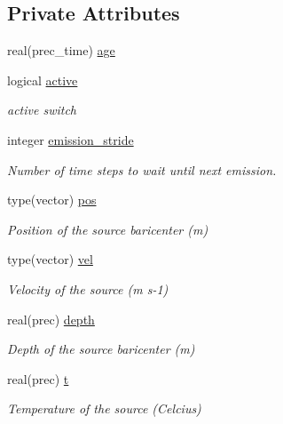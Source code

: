 \subsection*{Private Attributes}
\begin{DoxyCompactItemize}
\item 
real(prec\+\_\+time) \mbox{\hyperlink{structsources__mod_1_1source__state_a4ec18178b2bfbf4769892f26d62aa6f7}{age}}
\item 
logical \mbox{\hyperlink{structsources__mod_1_1source__state_ab31d51c870b76a1e4ca9b03f5847a7c2}{active}}
\begin{DoxyCompactList}\small\item\em active switch \end{DoxyCompactList}\item 
integer \mbox{\hyperlink{structsources__mod_1_1source__state_ae548879890ef326906a63d6555377e80}{emission\+\_\+stride}}
\begin{DoxyCompactList}\small\item\em Number of time steps to wait until next emission. \end{DoxyCompactList}\item 
type(vector) \mbox{\hyperlink{structsources__mod_1_1source__state_a8dacf7040158bb5214f66476bf1a1c3d}{pos}}
\begin{DoxyCompactList}\small\item\em Position of the source baricenter (m) \end{DoxyCompactList}\item 
type(vector) \mbox{\hyperlink{structsources__mod_1_1source__state_a52c6f025eb262a7a07b2a8b4ec7065ac}{vel}}
\begin{DoxyCompactList}\small\item\em Velocity of the source (m s-\/1) \end{DoxyCompactList}\item 
real(prec) \mbox{\hyperlink{structsources__mod_1_1source__state_a4dbafcfac12c749efd402a71e01a25cd}{depth}}
\begin{DoxyCompactList}\small\item\em Depth of the source baricenter (m) \end{DoxyCompactList}\item 
real(prec) \mbox{\hyperlink{structsources__mod_1_1source__state_a7d51970a13f9664bbaf9d09afea0b363}{t}}
\begin{DoxyCompactList}\small\item\em Temperature of the source (Celcius) \end{DoxyCompactList}\end{DoxyCompactItemize}


